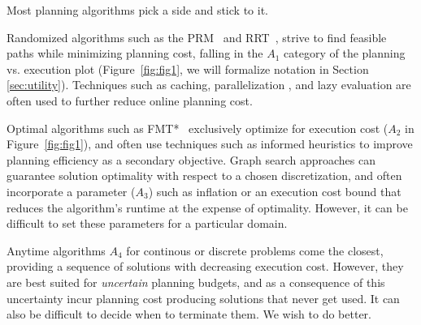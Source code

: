 Most planning algorithms pick a side and stick to it.

Randomized algorithms such as the
PRM~\citep{kavrakietal1996prm}
and RRT~\citep{lavallekuffner1999rrt},
strive to find feasible paths while minimizing planning cost,
falling in the $A_1$ category of the planning vs. execution
plot (Figure~\ref{fig:fig1}, we will formalize notation 
in Section \ref{sec:utility}).
Techniques such as caching, parallelization \citep{ichnowski2012prrt},
and lazy evaluation \citep{bohlin2000lazyprm}
are often used to further reduce online planning cost.

Optimal algorithms
such as FMT*~\citep{janson2015fmtstar}
exclusively optimize for execution
cost ($A_2$ in Figure~\ref{fig:fig1}), 
and often use techniques such as informed heuristics to improve
planning efficiency as a secondary objective.
Graph search approaches \citep{hart1968astar}
can guarantee solution optimality
with respect to a chosen discretization,
and often incorporate a parameter ($A_3$) such as inflation
\citep{pohl1970weightedastar}
or an execution cost bound \citep{stern2014}
that reduces the algorithm's runtime at the expense of optimality.
However,
it can be difficult to set these parameters for a particular domain.

Anytime algorithms $A_4$
for continous
\citep{karaman2011samplingoptimal, gammell2015bitstar, hauser2015lazy}
or discrete
\citep{likhachev2004arastar} problems
come the closest, providing a sequence of solutions
with decreasing execution cost.
However, they are best suited for \emph{uncertain}
planning budgets, and as a consequence of this uncertainty
incur planning cost producing
solutions that never get used.
It can also be difficult to decide when to terminate them.
We wish to do better.


